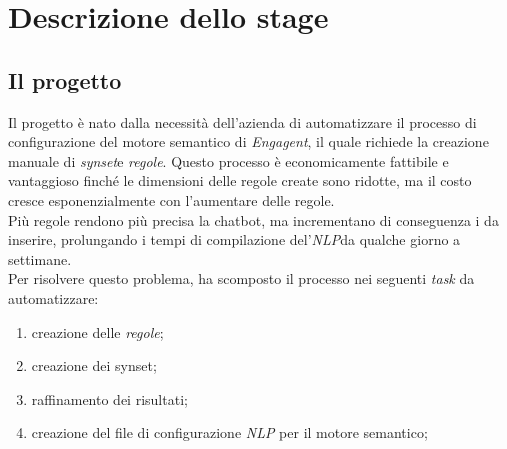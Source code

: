 
\chapter{Descrizione dello stage}
\label{cap:descrizione-stage}

\section{Il progetto}\label{sec:progetto}

Il progetto è nato dalla necessità dell'azienda \company di automatizzare il processo di configurazione del motore semantico di \emph{Engagent}\glsfirstoccur, il quale richiede la creazione manuale di \emph{synset}\glsfirstoccur e \emph{regole}\glsfirstoccur. Questo processo è economicamente fattibile e vantaggioso finché le dimensioni delle regole create sono ridotte, ma il costo cresce esponenzialmente con l'aumentare delle regole.\\
Più regole rendono più precisa la chatbot, ma incrementano di conseguenza i  da inserire, prolungando i tempi di compilazione del'\emph{NLP}\glsfirstoccur da qualche giorno a settimane.\\
Per risolvere questo problema, \company ha scomposto il processo nei seguenti \textit{task} da automatizzare:
\begin{enumerate}
    \item creazione delle \emph{regole}\glsfirstoccur;
    \item creazione dei synset;
    \item raffinamento dei risultati;
    \item creazione del file di configurazione \emph{NLP} per il motore semantico;
\end{enumerate}

